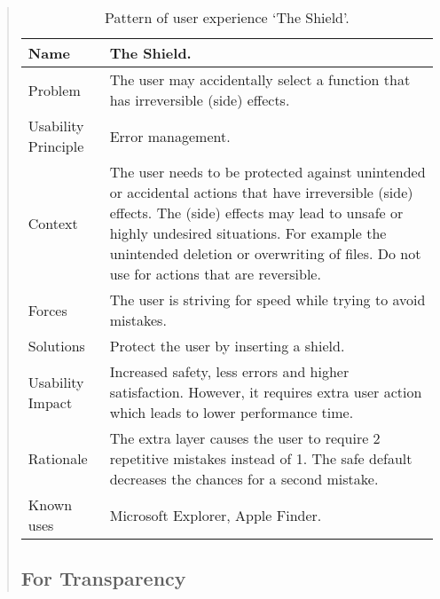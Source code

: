 \documentclass[a4paper,titlepage]{article}
\begin{document}
\begin{quote}
\begin{table}[!t]
  \caption{Pattern of user experience `The Shield'.}
  \label{tab:shield}
  \begin{center}
    \begin{tabular}{| p{} || p{} |}
      \hline
      Name & The Shield. \\ \hline

      Problem & The user may accidentally select a function that has
      irreversible (side) effects. \\ \hline

      Usability Principle & Error management. \\ \hline

      Context & The user needs to be protected against unintended or
      accidental actions that have irreversible (side) effects. The
      (side) effects may lead to unsafe or highly undesired
      situations. For example the unintended deletion or overwriting
      of files. Do not use for actions that are reversible. \\ \hline

      Forces & The user is striving for speed while trying to avoid
      mistakes. \\ \hline

      Solutions & Protect the user by inserting a shield. \\ \hline

      Usability Impact & Increased safety, less errors and higher
      satisfaction. However, it requires extra user action which leads
      to lower performance time. \\ \hline

      Rationale & The extra layer causes the user to require 2
      repetitive mistakes instead of 1. The safe default decreases the
      chances for a second mistake. \\ \hline

      Known uses & Microsoft Explorer, Apple Finder. \\ \hline
    \end{tabular}
  \end{center}
\end{table}

\subsection{For Transparency}


\end{quote}
\end{document}
